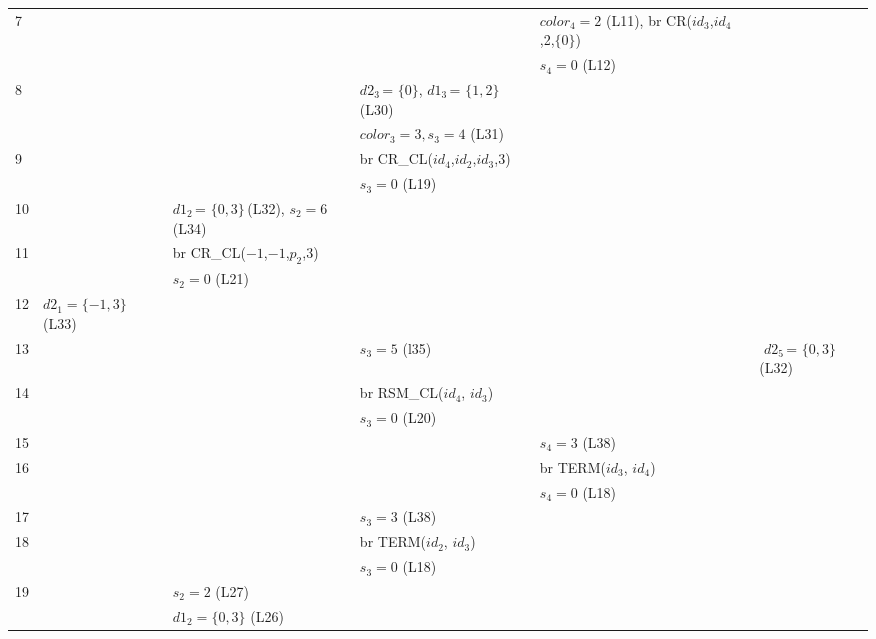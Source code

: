 \documentclass[11pt,english]{article}
\begin{document}
\begin{table}[h]
\begin{tabular}{|p{0.66cm}|p{2.7cm}|p{3.4cm}|p{2.95 cm}|p{2.46cm}|p{1.93cm}|}
 7 & & & &  $color_4=2$ (L11), \hspace{8 pt} br CR($id_3$,$id_4$,2,$\lbrace 0\rbrace$) & \\
& &  &   & $s_4 = 0$ (L12)&  \\\hline 

8 & &  & $d2_3$\,=\,\,$\lbrace 0 \rbrace$, \hspace{25 pt} $d1_3$\,=\,\,$\lbrace 1,2\rbrace$ (L30) &   & \\
& &  &  $color_3 = 3, s_3 = 4$ (L31) &  &  \\\hline 

9 & &  & \hspace{-4 pt} br CR\_CL($id_4$,$id_2$,$id_3$,3) &   & \\
& &  & $s_3 = 0$ (L19) &  &  \\\hline 

10 & & $d1_2$\,=\,\,$\lbrace 0,3 \rbrace$\,(L32), \hspace{20 pt}$s_2 = 6$ (L34) &  &   &  \\\hline 

11 & &  br CR\_CL($-1$,$-1$,$p_2$,3) &  &   & \\
& & $s_2 = 0$ (L21) &   &  &  \\\hline

12 & $d2_1 = \lbrace -1, 3\rbrace$ (L33) & &  &    &    \\\hline

13 & & & $s_3 = 5$ (l35)  &    & \hspace{-7.9 pt}$\,\,d2_5$\,=\,\,$\lbrace0,3\rbrace$ (L32) 
 \\\hline

14 & & & br RSM\_CL($id_4$,  $id_3$)  &    &  \\
& & & $s_3 = 0$ (L20)   &  &  \\\hline

15 & & &  &  $s_4 = 3$ (L38)   &   \\\hline

16 & & &  & br TERM($id_3$,  $id_4$)  &  \\
& & &   & $s_4 = 0$ (L18) &  \\\hline

17 & & & $s_3 = 3$ (L38) &    &   \\\hline


18 & & & br TERM($id_2$,  $id_3$) &   &  \\
& & &  $s_3 = 0$ (L18) &  &  \\\hline

19 & &  $s_2 = 2$ (L27)  &  &   &  \\
& & $d1_2 = \lbrace 0,3\rbrace$ (L26) & &  &  \\\hline


\end{tabular}
\end{table}
\end{document}
